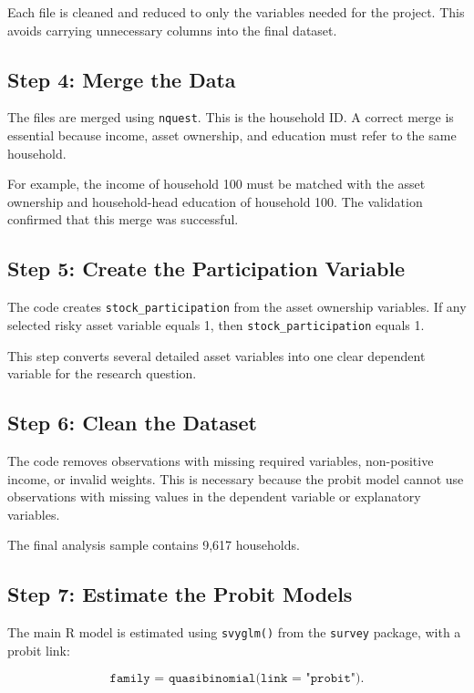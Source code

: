 \documentclass[12pt]{article}
\begin{document}
Each file is cleaned and reduced to only the variables needed for the project. This avoids carrying unnecessary columns into the final dataset.

\subsection{Step 4: Merge the Data}

The files are merged using \texttt{nquest}. This is the household ID. A correct merge is essential because income, asset ownership, and education must refer to the same household.

For example, the income of household 100 must be matched with the asset ownership and household-head education of household 100. The validation confirmed that this merge was successful.

\subsection{Step 5: Create the Participation Variable}

The code creates \texttt{stock\_participation} from the asset ownership variables. If any selected risky asset variable equals 1, then \texttt{stock\_participation} equals 1.

This step converts several detailed asset variables into one clear dependent variable for the research question.

\subsection{Step 6: Clean the Dataset}

The code removes observations with missing required variables, non-positive income, or invalid weights. This is necessary because the probit model cannot use observations with missing values in the dependent variable or explanatory variables.

The final analysis sample contains 9,617 households.

\subsection{Step 7: Estimate the Probit Models}

The main R model is estimated using \texttt{svyglm()} from the \texttt{survey} package, with a probit link:

\[
\texttt{family = quasibinomial(link = "probit")}.
\]
\end{document}

